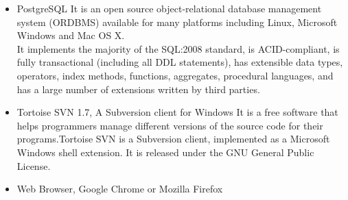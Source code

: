 \documentclass[12pt]{article}
\begin{document}
\begin{itemize}
\item PostgreSQL
It is an open source object-relational database management system (ORDBMS) available for many platforms including Linux, Microsoft Windows and Mac OS X. \\
It implements the majority of the SQL:2008 standard, is ACID-compliant, is fully transactional (including all DDL statements), has extensible data types, operators, index methods, functions, aggregates, procedural languages, and has a large number of extensions written by third parties.

\item Tortoise SVN 1.7, A Subversion client for Windows
It is a free software that helps programmers manage different versions of the source code for their programs.Tortoise SVN is a Subversion client, implemented as a Microsoft Windows shell extension. It is released under the GNU General Public License.

\item Web Browser, Google Chrome or Mozilla Firefox
\end{itemize}
\end{document}
